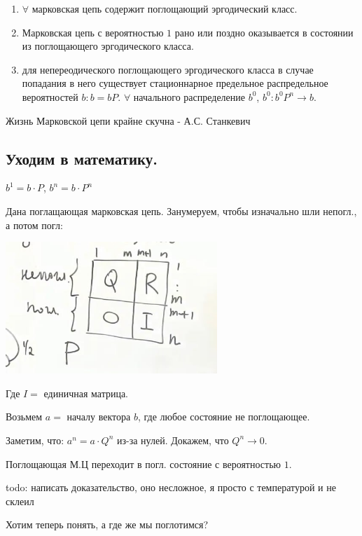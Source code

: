 \begin{enumerate}
    \item $\forall$ марковская цепь содержит поглощающий эргодический класс.
    \item Марковская цепь с вероятностью $1$ рано или поздно оказывается в состоянии из поглощающего эргодического класса.
    \item для непереодического поглощающего эргодического класса в случае попадания в него существует стационнарное предельное распредельное вероятностей $b: b = bP$. $\forall$ начального распределение $b^0$, $b^0:b^0P^n\rightarrow b$.
\end{enumerate}

Жизнь Марковской цепи крайне скучна - А.С. Станкевич

\subsection{Уходим в математику.}

$b^1=b\cdot P$, $b^n = b \cdot P^n$

Дана поглащающая марковская цепь. Занумеруем, чтобы изначально шли непогл., а потом погл:

\begin{center}
   \includegraphics[width=8cm]{assets/5_3_1.jpg}
\end{center}

Где $I =$ единичная матрица.

Возьмем $a = $ началу вектора $b$, где любое состояние не поглощающее.

Заметим, что: $a^n = a \cdot Q^n$ из-за нулей. Докажем, что $Q^n \rightarrow 0$. 


Поглощающая М.Ц переходит в погл. состояние с вероятностью $1$.

todo: написать доказательство, оно несложное, я просто с температурой и не склеил

Хотим теперь понять, а где же мы поглотимся?

